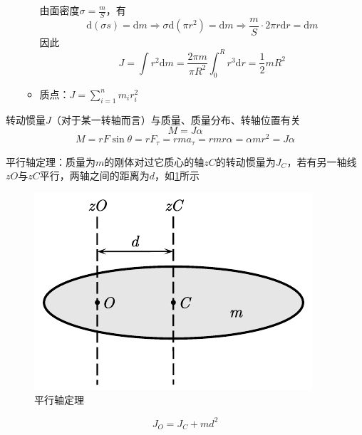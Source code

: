 \documentclass[12pt, a4paper, twoside]{ctexbook}
\begin{document}
\begin{itemize}
\begin{itemize}
\begin{figure}[H]
        \end{figure}
        由面密度$\sigma=\frac{m}{S}$，有
        $$
        \mathrm{d}\left(\sigma s\right)=\mathrm{d}m \Rightarrow \sigma\mathrm{d}\left(\pi r^2\right)=\mathrm{d}m \Rightarrow \frac{m}{S}\cdot2\pi r\mathrm{d}r=\mathrm{d}m
        $$
        因此
        $$
        J=\int r^2\mathrm{d}m=\frac{2\pi m}{\pi R^2}\int_{0}^{R} r^3\mathrm{d}r=\frac{1}{2}mR^2
        $$
        \item 质点：$J=\sum_{i=1}^{n}m_ir_i^2$
    \end{itemize}
\end{itemize}

转动惯量$J$（对于某一转轴而言）与质量、质量分布、转轴位置有关
$$
M=J\alpha
$$
$$
M=rF\sin\theta=rF_\tau=rma_\tau=rmr\alpha=\alpha mr^2=J\alpha
$$

{\sonti 平行轴定理}：质量为$m$的刚体对过它质心的轴$zC$的转动惯量为$J_C$，若有另一轴线$zO$与$zC$平行，两轴之间的距离为$d$，如\textcolor{blue}{\cref{fig:平行轴定理}}所示
\begin{figure}[H]
    \centerline{\includegraphics[scale=1.2]{平行轴定理.pdf}}
    \caption{平行轴定理}\label{fig:平行轴定理}
\end{figure}
$$
J_O=J_C+md^2
$$
\end{document}
